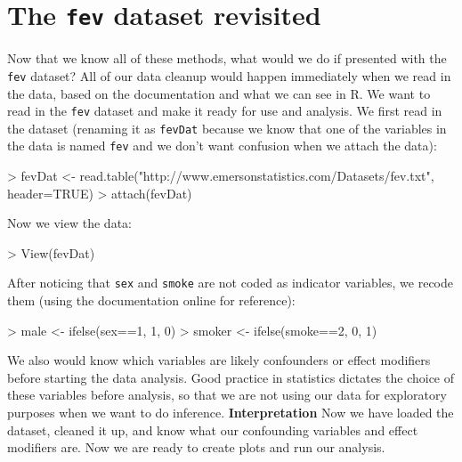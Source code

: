 \documentclass[landscape]{article}
\renewenvironment{Schunk}{\vspace{\topsep}}{\vspace{\topsep}}
\begin{document}
\section{The \texttt{fev} dataset revisited}
Now that we know all of these methods, what would we do if presented with the \texttt{fev} dataset? All of our data cleanup would happen immediately when we read in the data, based on the documentation and what we can see in R. 
\newline \indent We want to read in the \texttt{fev} dataset and make it ready for use and analysis.
\newline \indent We first read in the dataset (renaming it as \texttt{fevDat} because we know that one of the variables in the data is named \texttt{fev} and we don't want confusion when we attach the data):
\begin{Schunk}
\begin{Sinput}
> fevDat <- read.table("http://www.emersonstatistics.com/Datasets/fev.txt", header=TRUE)
> attach(fevDat)
\end{Sinput}
\end{Schunk}
Now we view the data:
\begin{Schunk}
\begin{Sinput}
> View(fevDat)
\end{Sinput}
\end{Schunk}
After noticing that \texttt{sex} and \texttt{smoke} are not coded as indicator variables, we recode them (using the documentation online for reference):
\begin{Schunk}
\begin{Sinput}
> male <- ifelse(sex==1, 1, 0)
> smoker <- ifelse(smoke==2, 0, 1)
\end{Sinput}
\end{Schunk}
We also would know which variables are likely confounders or effect modifiers before starting the data analysis. Good practice in statistics dictates the choice of these variables before analysis, so that we are not using our data for exploratory purposes when we want to do inference. \newline
{\large \textbf{Interpretation}}
\newline \indent Now we have loaded the dataset, cleaned it up, and know what our confounding variables and effect modifiers are. Now we are ready to create plots and run our analysis.
\end{document}
